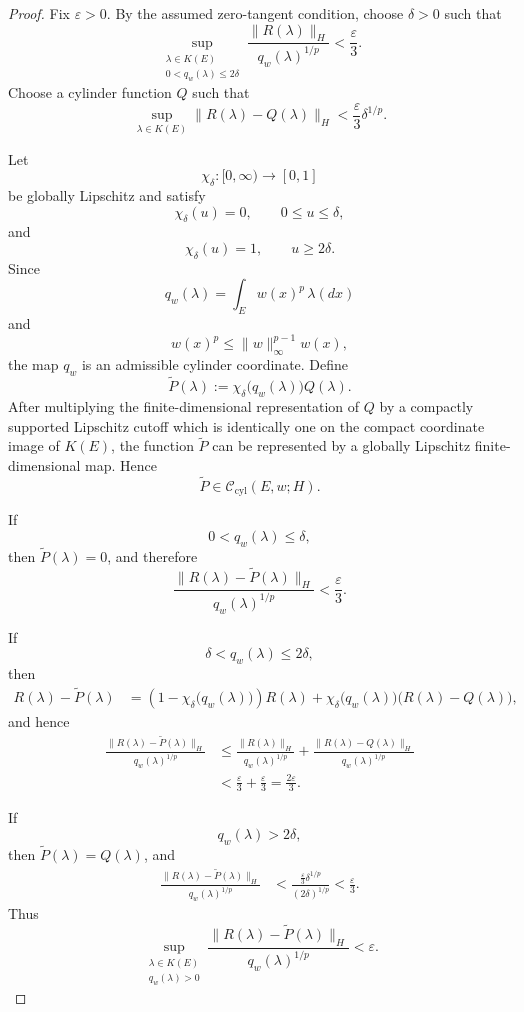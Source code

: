 \documentclass[a4paper,10pt]{article}
\begin{document}
\begin{proof}
Fix \(\varepsilon>0\). By the assumed zero-tangent condition, choose
\(\delta>0\) such that
\[
\sup_{\substack{\lambda\in K(E)\\
                 0<q_w(\lambda)\le2\delta}}
\frac{\lVert R(\lambda)\rVert_H}
     {q_w(\lambda)^{1/p}}
<
\frac{\varepsilon}{3}.
\]
Choose a cylinder function \(Q\) such that
\[
        \sup_{\lambda\in K(E)}
        \lVert R(\lambda)-Q(\lambda)\rVert_H
        <
        \frac{\varepsilon}{3}\delta^{1/p}.
\]

Let
\[
        \chi_\delta:[0,\infty)\longrightarrow[0,1]
\]
be globally Lipschitz and satisfy
\[
        \chi_\delta(u)=0,
        \qquad 0\le u\le\delta,
\]
and
\[
        \chi_\delta(u)=1,
        \qquad u\ge2\delta.
\]
Since
\[
        q_w(\lambda)
        =
        \int_Ew(x)^p\,\lambda(dx)
\]
and
\[
        w(x)^p
        \le
        \lVert w\rVert_\infty^{p-1}w(x),
\]
the map \(q_w\) is an admissible cylinder coordinate. Define
\[
        \widetilde P(\lambda)
        :=
        \chi_\delta\bigl(q_w(\lambda)\bigr)Q(\lambda).
\]
After multiplying the finite-dimensional representation of \(Q\) by
a compactly supported Lipschitz cutoff which is identically one on
the compact coordinate image of \(K(E)\), the function
\(\widetilde P\) can be represented by a globally Lipschitz
finite-dimensional map. Hence
\[
        \widetilde P\in\mathcal C_{\mathrm{cyl}}(E,w;H).
\]

If
\[
        0<q_w(\lambda)\le\delta,
\]
then \(\widetilde P(\lambda)=0\), and therefore
\[
\frac{\lVert R(\lambda)-\widetilde P(\lambda)\rVert_H}
     {q_w(\lambda)^{1/p}}
<
\frac{\varepsilon}{3}.
\]

If
\[
        \delta<q_w(\lambda)\le2\delta,
\]
then
\[
\begin{aligned}
R(\lambda)-\widetilde P(\lambda)
&=
\left(
1-\chi_\delta\bigl(q_w(\lambda)\bigr)
\right)R(\lambda)
+
\chi_\delta\bigl(q_w(\lambda)\bigr)
\bigl(R(\lambda)-Q(\lambda)\bigr),
\end{aligned}
\]
and hence
\[
\begin{aligned}
\frac{\lVert R(\lambda)-\widetilde P(\lambda)\rVert_H}
     {q_w(\lambda)^{1/p}}
&\le
\frac{\lVert R(\lambda)\rVert_H}
     {q_w(\lambda)^{1/p}}
+
\frac{\lVert R(\lambda)-Q(\lambda)\rVert_H}
     {q_w(\lambda)^{1/p}}
\\
&<
\frac{\varepsilon}{3}
+
\frac{\varepsilon}{3}
=
\frac{2\varepsilon}{3}.
\end{aligned}
\]

If
\[
        q_w(\lambda)>2\delta,
\]
then \(\widetilde P(\lambda)=Q(\lambda)\), and
\[
\begin{aligned}
\frac{\lVert R(\lambda)-\widetilde P(\lambda)\rVert_H}
     {q_w(\lambda)^{1/p}}
&<
\frac{
        \frac{\varepsilon}{3}\delta^{1/p}
     }{
        (2\delta)^{1/p}
     }
<
\frac{\varepsilon}{3}.
\end{aligned}
\]
Thus
\[
\sup_{\substack{\lambda\in K(E)\\q_w(\lambda)>0}}
\frac{\lVert R(\lambda)-\widetilde P(\lambda)\rVert_H}
     {q_w(\lambda)^{1/p}}
<
\varepsilon.
\]


\end{proof}
\end{document}

